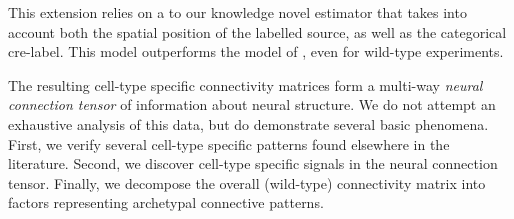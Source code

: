 This extension relies on a to our knowledge novel estimator that takes into account both the spatial position of the labelled source, as well as the categorical cre-label.
This model outperforms the model of \citet{Knox2019-ot}, even for wild-type experiments.

The resulting cell-type specific connectivity matrices form a multi-way \textit{neural connection tensor} of information about neural structure.
We do not attempt an exhaustive analysis of this data, but do demonstrate several basic phenomena.
First, we verify several cell-type specific patterns found elsewhere in the literature.
Second, we discover cell-type specific signals in the neural connection tensor.
Finally, we decompose the overall (wild-type) connectivity matrix into factors representing archetypal connective patterns.



\newpage
